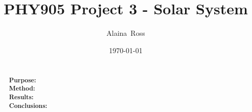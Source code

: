 \documentclass[prc,amsmath,twocolumn,superscriptaddress]{revtex4}
\begin{document}
  \newcommand {\nc} {\newcommand}
  \nc {\Sec} [1] {Sec.~\ref{#1}}
  \nc {\IR} [1] {\textcolor{red}{#1}} 

\title{PHY905 Project 3 - Solar System}


\author{Alaina~Ross}

\date{\today}


\begin{abstract}
\\ {\bf Purpose:} %
\\ {\bf Method:} %
\\ {\bf Results:} %
 \\ {\bf Conclusions:} %
\end{abstract}


\maketitle

\end{document}
